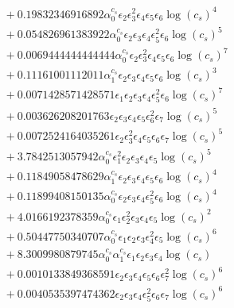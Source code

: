 \documentclass[10pt]{article}
\begin{document}
\begin{align*}
&{}  + 0.19832346916892 \alpha_{0}^{c_s} \epsilon_{2} \epsilon_{3}^{2} \epsilon_{4} \epsilon_{5} \epsilon_{6} \log{\left(c_{s} \right)}^{4} \\
&{}  + 0.054826961383922 \alpha_{0}^{c_s} \epsilon_{2} \epsilon_{3} \epsilon_{4} \epsilon_{5}^{2} \epsilon_{6} \log{\left(c_{s} \right)}^{5} \\
&{}  + 0.0069444444444444 \alpha_{0}^{c_s} \epsilon_{2} \epsilon_{3}^{2} \epsilon_{4} \epsilon_{5} \epsilon_{6} \log{\left(c_{s} \right)}^{7} \\
&{}  + 0.11161001112011 \alpha_{1}^{c_s} \epsilon_{2} \epsilon_{3} \epsilon_{4} \epsilon_{5} \epsilon_{6} \log{\left(c_{s} \right)}^{3} \\
&{}  + 0.0071428571428571 \epsilon_{1} \epsilon_{2} \epsilon_{3} \epsilon_{4} \epsilon_{5}^{2} \epsilon_{6} \log{\left(c_{s} \right)}^{7} \\
&{}  + 0.003626208201763 \epsilon_{2} \epsilon_{3} \epsilon_{4} \epsilon_{5} \epsilon_{6}^{2} \epsilon_{7} \log{\left(c_{s} \right)}^{5} \\
&{}  + 0.0072524164035261 \epsilon_{2} \epsilon_{3}^{2} \epsilon_{4} \epsilon_{5} \epsilon_{6} \epsilon_{7} \log{\left(c_{s} \right)}^{5} \\
&{}  + 3.7842513057942 \alpha_{0}^{c_s} \epsilon_{1}^{2} \epsilon_{2} \epsilon_{3} \epsilon_{4} \epsilon_{5} \log{\left(c_{s} \right)}^{5} \\
&{}  + 0.11849058478629 \alpha_{1}^{c_s} \epsilon_{2} \epsilon_{3} \epsilon_{4} \epsilon_{5} \epsilon_{6} \log{\left(c_{s} \right)}^{4} \\
&{}  + 0.11899408150135 \alpha_{0}^{c_s} \epsilon_{2} \epsilon_{3} \epsilon_{4} \epsilon_{5}^{2} \epsilon_{6} \log{\left(c_{s} \right)}^{4} \\
&{}  + 4.0166192378359 \alpha_{0}^{c_s} \epsilon_{1} \epsilon_{2}^{2} \epsilon_{3} \epsilon_{4} \epsilon_{5} \log{\left(c_{s} \right)}^{2} \\
&{}  + 0.50447750340707 \alpha_{0}^{c_s} \epsilon_{1} \epsilon_{2} \epsilon_{3} \epsilon_{4}^{2} \epsilon_{5} \log{\left(c_{s} \right)}^{6} \\
&{}  + 8.3009980879745 \alpha_{0}^{c_s} \alpha_{1}^{c_s} \epsilon_{1} \epsilon_{2} \epsilon_{3} \epsilon_{4} \log{\left(c_{s} \right)} \\
&{}  + 0.0010133849368591 \epsilon_{2} \epsilon_{3} \epsilon_{4} \epsilon_{5} \epsilon_{6} \epsilon_{7}^{2} \log{\left(c_{s} \right)}^{6} \\
&{}  + 0.0040535397474362 \epsilon_{2} \epsilon_{3} \epsilon_{4} \epsilon_{5}^{2} \epsilon_{6} \epsilon_{7} \log{\left(c_{s} \right)}^{6} \\

\end{align*}
\end{document}
